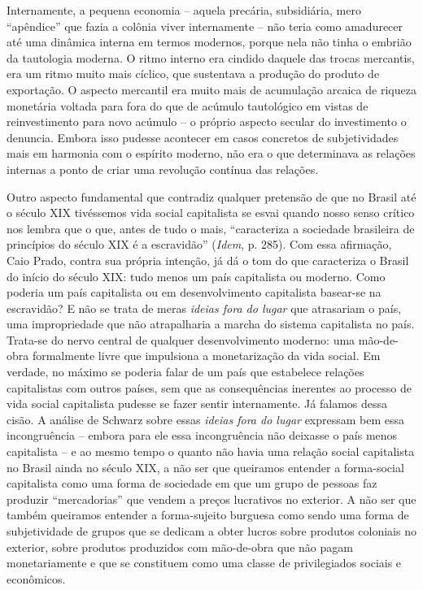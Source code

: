 Internamente, a pequena economia -- aquela precária, subsidiária, mero
``apêndice'' que fazia a colônia viver internamente -- não teria como
amadurecer até uma dinâmica interna em termos modernos, porque nela não
tinha o embrião da tautologia moderna. O ritmo interno era cindido
daquele das trocas mercantis, era um ritmo muito mais cíclico, que
sustentava a produção do produto de exportação. O aspecto mercantil era
muito mais de acumulação arcaica de riqueza monetária voltada para fora
do que de acúmulo tautológico em vistas de reinvestimento para novo
acúmulo -- o próprio aspecto secular do investimento o denuncia. Embora
isso pudesse acontecer em casos concretos de subjetividades mais em
harmonia com o espírito moderno, não era o que determinava as relações
internas a ponto de criar uma revolução contínua das relações.

Outro aspecto fundamental que contradiz qualquer pretensão de que no
Brasil até o século XIX tivéssemos vida social capitalista se esvai
quando nosso senso crítico nos lembra que o que, antes de tudo o mais,
``caracteriza a sociedade brasileira de princípios do século XIX é a
escravidão'' (\emph{Idem}, p. 285). Com essa afirmação, Caio Prado,
contra sua própria intenção, já dá o tom do que caracteriza o Brasil do
início do século XIX: tudo menos um país capitalista ou moderno. Como
poderia um país capitalista ou em desenvolvimento capitalista basear-se
na escravidão? E não se trata de meras \emph{ideias fora do lugar} que
atrasariam o país, uma impropriedade que não atrapalharia a marcha do
sistema capitalista no país. Trata-se do nervo central de qualquer
desenvolvimento moderno: uma mão-de-obra formalmente livre que
impulsiona a monetarização da vida social. Em verdade, no máximo se
poderia falar de um país que estabelece relações capitalistas com outros
países, sem que as consequências inerentes ao processo de vida social
capitalista pudesse se fazer sentir internamente. Já falamos dessa
cisão. A análise de Schwarz sobre essas \emph{ideias fora do lugar}
expressam bem essa incongruência -- embora para ele essa incongruência
não deixasse o país menos capitalista -- e ao mesmo tempo o quanto não
havia uma relação social capitalista no Brasil ainda no século XIX, a
não ser que queiramos entender a forma-social capitalista como uma forma
de sociedade em que um grupo de pessoas faz produzir ``mercadorias'' que
vendem a preços lucrativos no exterior. A não ser que também queiramos
entender a forma-sujeito burguesa como sendo uma forma de subjetividade
de grupos que se dedicam a obter lucros sobre produtos coloniais no
exterior, sobre produtos produzidos com mão-de-obra que não pagam
monetariamente e que se constituem como uma classe de privilegiados
sociais e econômicos.

